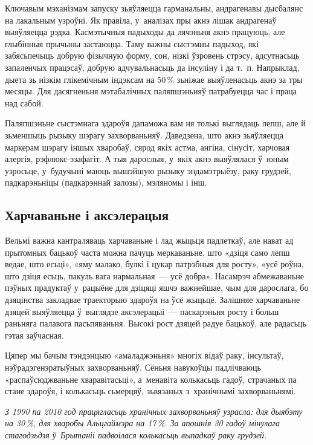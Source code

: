 Ключавым мэханізмам запуску зьяўляецца гарманальны, андрагенавы дысбалянс на лакальным узроўні. Як правіла, у~аналізах пры акнэ лішак андрагенаў выяўляецца рэдка. Касмэтычныя падыходы да лячэньня акнэ працуюць, але глыбінныя прычыны застаюцца. Таму важны сыстэмны падыход, які забясьпечыць добрую фізычную форму, сон, нізкі ўзровень стрэсу, адсутнасьць запаленчых працэсаў, добрую адчувальнасьць да інсуліну і да т.~п. Напрыклад, дыета зь нізкім глікемічным індэксам на 50\,\% зьніжае выяўленасьць акнэ за тры месяцы. Для дасягненьня мэтабалічных паляпшэньняў патрабуецца час і праца над сабой.

Паляпшэньне сыстэмнага здароўя дапаможа вам ня толькі выглядаць лепш, але й зьменшыць рызыку шэрагу захворваньняў. Даведзена, што акнэ зьяўляецца маркерам шэрагу іншых хваробаў, сярод якіх астма, ангіна, сінусіт, харчовая алергія, рэфлюкс-эзафагіт. А тыя дарослыя, у~якіх акнэ выяўлялася ў~юным узросьце, у~будучыні маюць вышэйшую рызыку эндамэтрыёзу, раку грудзей, падкарэньніцы (падкарэннай залозы), мэляномы і інш.

\subsection*{Харчаваньне і аксэлерацыя}

Вельмі важна кантраляваць харчаваньне і лад жыцьця падлеткаў, але нават ад прытомных бацькоў часта можна пачуць меркаваньне, што «дзіця само лепш ведае, што есьці», «яму малако, булкі і цукар патрэбныя для росту», «усё роўна, што дзіця есьць, пакуль вага нармальная~--- усё добра». Насамрэч абмежаваньне пэўных прадуктаў у~рацыёне для дзіцяці яшчэ важнейшае, чым для дарослага, бо дзяцінства закладвае траекторыю здароўя на ўсё жыцьцё. Залішняе харчаваньне дзяцей выяўляецца ў~выглядзе аксэлерацыі~--- паскарэньня росту і больш раньняга палавога пасьпяваньня. Высокі рост дзяцей радуе бацькоў, але радасьць гэтая заўчасная. 


Цяпер мы бачым тэндэнцыю «амаладжэньня» многіх відаў раку, інсультаў, нэўрадэгенэратыўных захворваньняў. Сёньня навукоўцы падлічваюць «распаўсюджваньне хваравітасьці», а~менавіта колькасьць гадоў, страчаных па стане здароўя, і колькасьць сьмерцяў, зьвязаных з~хранічнымі захворваньнямі. 

\emph{З 1990 па 2010 год працягласьць хранічных захворваньняў узрасла: для дыябэту на 30\,\%, для хваробы Альцгаймэра на 17\,\%. За апошнія 30 гадоў мінулага стагодзьдзя ў~Брытаніі падвоілася колькасьць выпадкаў раку грудзей.}

